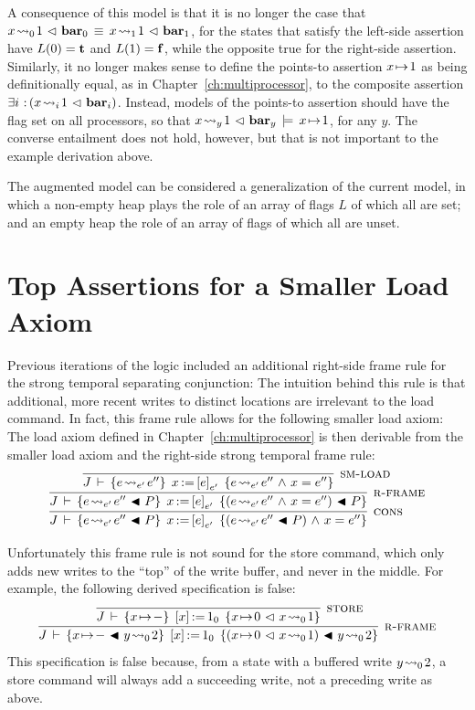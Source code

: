 \documentclass[11pt]{report}
\begin{document}
A consequence of this model is that it is no longer the case that $x \!\leadsto_{0}\! 1 \operatorname{\,\vartriangleleft\,} \mathbf{bar}_{0} \,\equiv\, x \!\leadsto_{1}\! 1 \operatorname{\,\vartriangleleft\,} \mathbf{bar}_{1}$, for the states that satisfy the left-side assertion have $L(0) = \mathbf{t}$ and $L(1) = \mathbf{f}$, while the opposite true for the right-side assertion. Similarly, it no longer makes sense to define the points-to assertion $x \!\mapsto\! 1$ as being definitionally equal, as in Chapter~\ref{ch:multiprocessor}, to the composite assertion $\exists i \operatorname{\,:\,} (x \!\leadsto_{i}\! 1 \operatorname{\,\vartriangleleft\,} \mathbf{bar}_{i})$. Instead, models of the points-to assertion should have the flag set on all processors, so that $x \!\leadsto_{y}\! 1 \operatorname{\,\vartriangleleft\,} \mathbf{bar}_{y} \,\models\, x \!\mapsto\! 1$, for any $y$. The converse entailment does not hold, however, but that is not important to the example derivation above. 

The augmented model can be considered a generalization of the current model, in which a non-empty heap plays the role of an array of flags $L$ of which all are set; and an empty heap the role of an array of flags of which all are unset. 

\section{Top Assertions for a Smaller Load Axiom}
\label{sec:top-assertion}

Previous iterations of the logic included an additional right-side frame rule for the strong temporal separating conjunction:  The intuition behind this rule is that additional, more recent writes to distinct locations are irrelevant to the load command. In fact, this frame rule allows for the following smaller load axiom:  The load axiom defined in Chapter~\ref{ch:multiprocessor} is then derivable from the smaller load axiom and the right-side strong temporal frame rule: \[ \infer[\textsc{cons}]{\spec{J}{e \fwrite{e'} e'' \fsseq P}{\cload{x}{e}_{e'}}{(e \fwrite{e'} e'' \fsseq P) \conj x = e''}}{\infer[\textsc{r-frame}]{\spec{J}{e \fwrite{e'} e'' \fsseq P}{\cload{x}{e}_{e'}}{(e \fwrite{e'} e'' \conj x = e'') \fsseq P }}{\infer[\textsc{sm-load}]{\spec{J}{e \fwrite{e'} e''}{\cload{x}{e}_{e'}}{e \fwrite{e'} e'' \conj x = e''}}{}}}\]

Unfortunately this frame rule is not sound for the store command, which only adds new writes to the ``top'' of the write buffer, and never in the middle. For example, the following derived specification is false: \[ \infer[\textsc{r-frame}]{\spec{J}{x \fpointsto - \fsseq y \fwrite{0} 2}{\cstore{x}{1}_0}{(x \fpointsto 0 \fseq x \fwrite{0} 1) \fsseq y \fwrite{0} 2}}{\infer[\textsc{store}]{\spec{J}{x \fpointsto - }{\cstore{x}{1}_0}{x \fpointsto 0 \fseq x \fwrite{0} 1}}{}}\] This specification is false because, from a state with a buffered write $y \!\leadsto_{0}\! 2$, a store command will always add a succeeding write, not a preceding write as above. 
\end{document}
